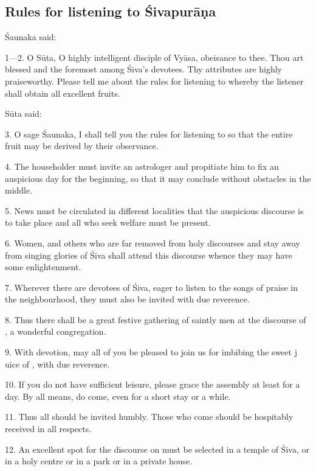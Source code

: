{}
\subsection*{Rules for listening to Śivapurāṇa}

Śaunaka said:

1—2. O Sūta, O highly intelligent disciple of Vyāsa, obeisance to thee. Thou art
blessed and the foremost among Śiva’s devotees. Thy attributes are highly
praiseworthy. Please tell me about the rules for listening to 
whereby the listener shall obtain all excellent fruits.

Sūta said:

3. O sage Śaunaka, I shall tell you the rules for listening to 
so that the entire fruit may be derived by their observance.

4. The householder must invite an astrologer and propitiate him to fix an
auspicious day for the beginning, so that it may conclude without obstacles in
the middle.

5. News must be circulated in different localities that the auspicious discourse
is to take place and all who seek welfare must be present.

6. Women,  and others who are far removed from holy discourses and
stay away from singing glories of Śiva shall attend this discourse whence they
may have some enlightenment.

7. Wherever there are devotees of Śiva, eager to listen to the songs of praise
in the neighbourhood, they must also be invited with due reverence.

8. Thus there shall be a great festive gathering of saintly men at the discourse
of , a wonderful congregation.

9. With devotion, may all of you be pleased to join us for imbibing the sweet j
uice of , with due reverence.

10. If you do not have sufficient leisure, please grace the assembly at least
for a day. By all means, do come, even for a short stay or a while.

11. Thus all should be invited humbly. Those who come should be hospitably
received in all respects.

12. An excellent spot for the discourse on  must be selected in
a temple of Śiva, or in a holy centre or in a park or in a private house.

